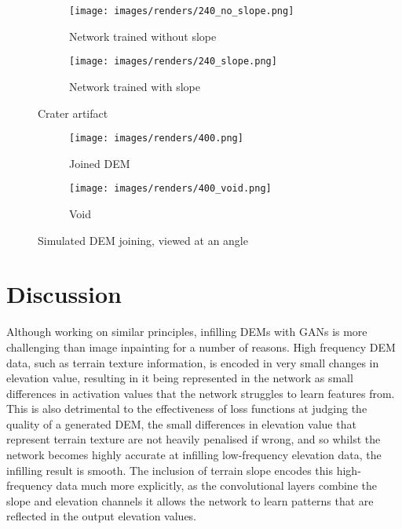 \documentclass[twocolumn]{article}
\begin{document}
\begin{figure}
\begin{subfigure}{1\columnwidth}
  \caption{Network trained without slope}
  \texttt{[image: images/renders/240\_no\_slope.png]}
  \label{fig:240_no_slope}
\end{subfigure}
\hfill
\begin{subfigure}{1\columnwidth}
  \caption{Network trained with slope}
  \texttt{[image: images/renders/240\_slope.png]}
  \label{fig:240_slope}
\end{subfigure}

\caption{Crater artifact}
\label{fig:crater_artifact}
\end{figure}

\begin{figure}
\centering
\begin{subfigure}{1\columnwidth}
  \caption{Joined DEM}
  \texttt{[image: images/renders/400.png]}
  \label{fig:400}
\end{subfigure}
\hfill
\begin{subfigure}{1\columnwidth}
  \caption{Void}
  \texttt{[image: images/renders/400\_void.png]}
  \label{fig:400_void}
\end{subfigure}
\caption{Simulated DEM joining, viewed at an angle}
\label{fig:simulated_joining}
\end{figure}


\section{Discussion}
\label{sec:org526b2b4}

Although working on similar principles, infilling DEMs with GANs is more challenging than image inpainting for a number of reasons.
High frequency DEM data, such as terrain texture information, is encoded in very small changes in elevation value, resulting in it being represented in the network as small differences in activation values that the network struggles to learn features from.
This is also detrimental to the effectiveness of loss functions at judging the quality of a generated DEM, the small differences in elevation value that represent terrain texture are not heavily penalised if wrong, and so whilst the network becomes highly accurate at infilling low-frequency elevation data, the infilling result is smooth.
The inclusion of terrain slope encodes this high-frequency data much more explicitly, as the convolutional layers combine the slope and elevation channels it allows the network to learn patterns that are reflected in the output elevation values.
\end{document}
